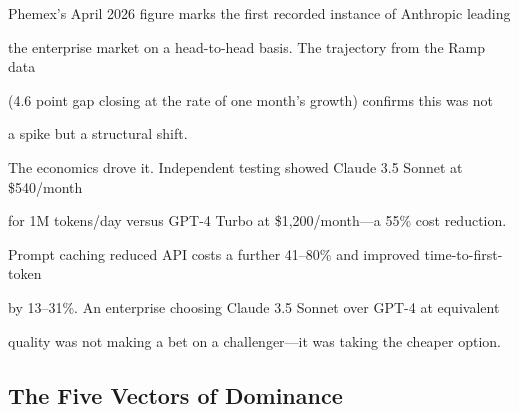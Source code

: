 










Phemex's April 2026 figure marks the first recorded instance of Anthropic leading





the enterprise market on a head-to-head basis. The trajectory from the Ramp data





(4.6 point gap closing at the rate of one month's growth) confirms this was not





a spike but a structural shift.











The economics drove it. Independent testing showed Claude 3.5 Sonnet at \$540/month





for 1M tokens/day versus GPT-4 Turbo at \$1,200/month---a 55\% cost reduction.





Prompt caching reduced API costs a further 41--80\% and improved time-to-first-token





by 13--31\%. An enterprise choosing Claude 3.5 Sonnet over GPT-4 at equivalent





quality was not making a bet on a challenger---it was taking the cheaper option.











\subsection{The Five Vectors of Dominance}












